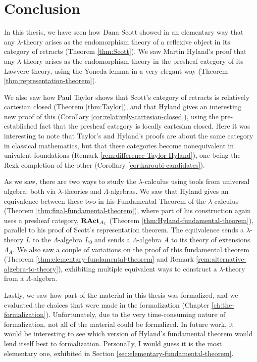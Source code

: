 \chapter{Conclusion}
In this thesis, we have seen how Dana Scott showed in an elementary way that any $ \lambda $-theory arises as the endomorphism theory of a reflexive object in its category of retracts (Theorem \ref{thm:Scott}). We saw Martin Hyland's proof that any $ \lambda $-theory arises as the endomorphism theory in the presheaf category of its Lawvere theory, using the Yoneda lemma in a very elegant way (Theorem \ref{thm:representation-theorem}).

We also saw how Paul Taylor shows that Scott's category of retracts is relatively cartesian closed (Theorem \ref{thm:Taylor}), and that Hyland gives an interesting new proof of this (Corollary \ref{cor:relatively-cartesian-closed}), using the pre-established fact that the presheaf category is locally cartesian closed. Here it was interesting to note that Taylor's and Hyland's proofs are about the same category in classical mathematics, but that these categories become nonequivalent in univalent foundations (Remark \ref{rem:difference-Taylor-Hyland}), one being the Rezk completion of the other (Corollary \ref{cor:karoubi-candidates}).

As we saw, there are two ways to study the $ \lambda $-calculus using tools from universal algebra: both via $ \lambda $-theories and $ \Lambda $-algebras. We saw that Hyland gives an equivalence between these two in his Fundamental Theorem of the $ \lambda $-calculus (Theorem \ref{thm:final-fundamental-theorem}), where part of his construction again uses a presheaf category, $ \mathbf{RAct}_{A_1} $ (Theorem \ref{thm:Hyland-fundamental-theorem}), parallel to his proof of Scott's representation theorem. The equivalence sends a $ \lambda $-theory $ L $ to the $ \Lambda $-algebra $ L_0 $ and sends a $ \Lambda $-algebra $ A $ to its theory of extensions $ \Lambda_A $. We also saw a couple of variations on the proof of this fundamental theorem (Theorem \ref{thm:elementary-fundamental-theorem} and Remark \ref{rem:alternative-algebra-to-theory}), exhibiting multiple equivalent ways to construct a $ \lambda $-theory from a $ \Lambda $-algebra.

Lastly, we saw how part of the material in this thesis was formalized, and we evaluated the choices that were made in the formalization (Chapter \ref{ch:the-formalization}). Unfortunately, due to the very time-consuming nature of formalization, not all of the material could be formalized. In future work, it would be interesting to see which version of Hyland's fundamental theorem would lend itself best to formalization. Personally, I would guess it is the most elementary one, exhibited in Section \ref{sec:elementary-fundamental-theorem}.

